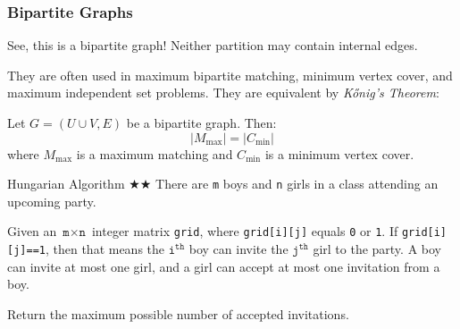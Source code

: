 \documentclass{article}
\begin{document}
\subsubsection{Bipartite Graphs}

\begin{center}
\end{center}

See, this is a bipartite graph! Neither partition may contain internal edges.

They are often used in maximum bipartite matching, minimum vertex cover, and maximum independent set problems. They are equivalent by \emph{Kőnig's Theorem}:


\begin{mdquote}
    Let $G = (U \cup V, E)$ be a bipartite graph. Then:
    $$ |M_{\max}| = |C_{\min}| $$
    where $M_{\max}$ is a maximum matching and $C_{\min}$ is a minimum vertex cover.
\end{mdquote}


\begin{Question}{Hungarian Algorithm $\bigstar\bigstar$}
There are \texttt{m} boys and \texttt{n} girls in a class attending an upcoming party.

Given an $\texttt{m}\times\texttt{n}$ integer matrix \texttt{grid}, where \texttt{grid[i][j]} equals \texttt{0} or \texttt{1}. If \texttt{grid[i][j]==1}, then that means the $\texttt{i}^{\texttt{th}}$ boy can invite the $\texttt{j}^{\texttt{th}}$ girl to the party. A boy can invite at most one girl, and a girl can accept at most one invitation from a boy.

Return the maximum possible number of accepted invitations.
\end{Question}
\end{document}
